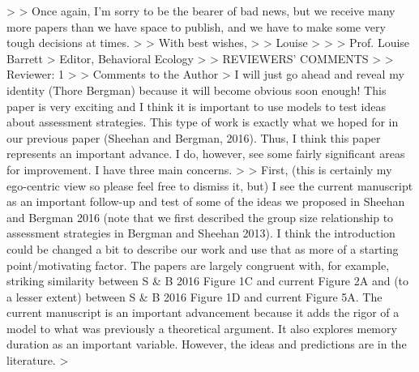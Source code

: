>
> Once again, I'm sorry to be the bearer of bad news, but we receive many more papers than we have space to publish, and we have to make some very tough decisions at times.
>
> With best wishes,
>
> Louise
>
>
> Prof. Louise Barrett
> Editor, Behavioral Ecology
>
> REVIEWERS' COMMENTS
>
> Reviewer: 1
>
> Comments to the Author
> I will just go ahead and reveal my identity (Thore Bergman) because it will become obvious soon enough! This paper is very exciting and I think it is important to use models to test ideas about assessment strategies. This type of work is exactly what we hoped for in our previous paper (Sheehan and Bergman, 2016). Thus, I think this paper represents an important advance. I do, however, see some fairly significant areas for improvement. I have three main concerns.
>
> First, (this is certainly my ego-centric view so please feel free to dismiss it, but) I see the current manuscript as an important follow-up and test of some of the ideas we proposed in Sheehan and Bergman 2016 (note that we first described the group size relationship to assessment strategies in Bergman and Sheehan 2013).  I think the introduction could be changed a bit to describe our work and use that as more of a starting point/motivating factor. The papers are largely congruent with, for example, striking similarity between S & B 2016 Figure 1C and current Figure 2A and (to a lesser extent) between S & B 2016 Figure 1D and current Figure 5A. The current manuscript is an important advancement because it adds the rigor of a model to what was previously a theoretical argument. It also explores memory duration as an important variable. However, the ideas and predictions are in the literature.
>

